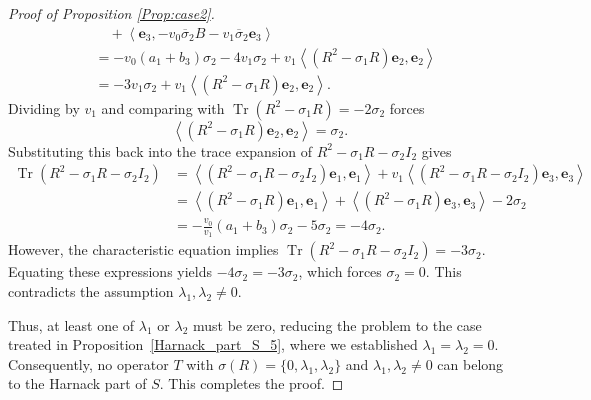 \documentclass[10pt,a4paper]{amsart}
\begin{document}
\begin{proof}[Proof of Proposition \ref{Prop:case2}]
\begin{align*}
		&\quad + \left\langle \mathbf{e}_3, -v_0 \overline{\sigma}_2 B - v_1 \overline{\sigma}_2 \mathbf{e}_3 \right\rangle \\
		&= -v_0(a_1+b_3)\sigma_2 - 4v_1 \sigma_2 + v_1\left\langle (R^2 - \sigma_1 R)\mathbf{e}_2, \mathbf{e}_2 \right\rangle \\
		&= -3v_1 \sigma_2 + v_1\left\langle (R^2 - \sigma_1 R)\mathbf{e}_2, \mathbf{e}_2 \right\rangle.
	\end{align*}
	Dividing by $v_1$ and comparing with $\operatorname{Tr}(R^2 - \sigma_1 R) = -2\sigma_2$ forces
	\[
	\left\langle (R^2 - \sigma_1 R)\mathbf{e}_2, \mathbf{e}_2 \right\rangle = \sigma_2.
	\]
	Substituting this back into the trace expansion of $R^2 - \sigma_1 R - \sigma_2 I_2$ gives
\begin{align*}
		\operatorname{Tr}(R^2 - \sigma_1 R - \sigma_2 I_2) &= \left\langle (R^2 - \sigma_1 R - \sigma_2 I_2) \mathbf{e}_1, \mathbf{e}_1 \right\rangle + v_1\left\langle(R^2 - \sigma_1 R - \sigma_2 I_2)\mathbf{e}_3, \mathbf{e}_3\right\rangle \\
		&=\left\langle (R^2 - \sigma_1 R)   \mathbf{e}_1, \mathbf{e}_1 \right\rangle + \left\langle(R^2 - \sigma_1 R)\mathbf{e}_3, \mathbf{e}_3\right\rangle-2 \sigma_2 \\
		&=-\frac{v_0}{v_1}(a_1+b_3)\sigma_2 - 5\sigma_2 = -4\sigma_2.
\end{align*}
	However, the characteristic equation implies $\operatorname{Tr}(R^2 - \sigma_1 R - \sigma_2 I_2) = -3\sigma_2$. Equating these expressions yields $-4\sigma_2 = -3\sigma_2$, which forces $\sigma_2 = 0$. This contradicts the assumption $\lambda_1, \lambda_2 \neq 0$. 
	
	Thus, at least one of $\lambda_1$ or $\lambda_2$ must be zero, reducing the problem to the case treated in Proposition~\ref{Harnack_part_S_5}, where we established $\lambda_1 = \lambda_2 = 0$. Consequently, no operator $T$ with $\sigma(R)=\{0, \lambda_1, \lambda_2\}$ and $\lambda_1, \lambda_2 \neq 0$ can belong to the Harnack part of $S$. This completes the proof.
\end{proof}
\end{document}
